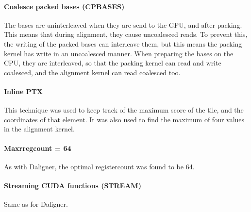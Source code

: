 \documentclass[../main/thesis.tex]{subfiles}
\begin{document}
\paragraph{Coalesce packed bases (CPBASES)}
The bases are uninterleaved when they are send to the GPU, and after packing.
This means that during alignment, they cause uncoalesced reads.
To prevent this, the writing of the packed bases can interleave them, but this means the packing kernel has write in an uncoalesced manner.
When preparing the bases on the CPU, they are interleaved, so that the packing kernel can read and write coalesced, and the alignment kernel can read coalesced too.

\paragraph{Inline PTX}
This technique was used to keep track of the maximum score of the tile, and the coordinates of that element.
It was also used to find the maximum of four values in the alignment kernel.

\paragraph{Maxrregcount = 64}
As with Daligner, the optimal registercount was found to be 64.

\paragraph{Streaming CUDA functions (STREAM)}
Same as for Daligner.
\end{document}
